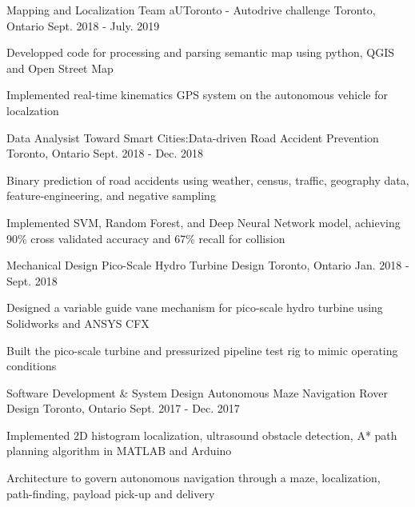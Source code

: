\begin{cventries}
  \cventry
  {Mapping and Localization Team}
  {aUToronto - Autodrive challenge}
  {Toronto, Ontario}
  {Sept. 2018 - July. 2019}
  {
    \begin{cvitems}
      \item {Developped code for processing and parsing semantic map using python, QGIS and Open Street Map}
      \item {Implemented real-time kinematics GPS system on the autonomous vehicle for localzation}
    \end{cvitems}
  }

  \cventry
  {Data Analysist}
  {Toward Smart Cities:Data-driven Road Accident Prevention}
  {Toronto, Ontario}
  {Sept. 2018 - Dec. 2018}
  {
    \begin{cvitems}
      \item {Binary prediction of road accidents using weather, census, traffic, geography data, feature-engineering, and negative sampling}
      \item {Implemented SVM, Random Forest, and Deep Neural Network model, achieving 90\% cross validated accuracy and 67\% recall for collision}
    \end{cvitems}
  }

  \cventry
    {Mechanical Design}
    {Pico-Scale Hydro Turbine Design}
    {Toronto, Ontario}
    {Jan. 2018 - Sept. 2018}
    {
      \begin{cvitems}
        \item {Designed a variable guide vane mechanism for pico-scale hydro turbine using Solidworks and ANSYS CFX}
        \item {Built the pico-scale turbine and pressurized pipeline test rig to mimic operating conditions}
      \end{cvitems}
    }

    \cventry
    {Software Development \& System Design}
    {Autonomous Maze Navigation Rover Design}
    {Toronto, Ontario}
    {Sept. 2017 - Dec. 2017}
    {
      \begin{cvitems}
        \item {Implemented 2D histogram localization, ultrasound obstacle detection, A* path planning algorithm in MATLAB and Arduino}
        \item {Architecture to govern autonomous navigation through a maze, localization, path-finding, payload pick-up and delivery}
      \end{cvitems}
    }


\end{cventries}
